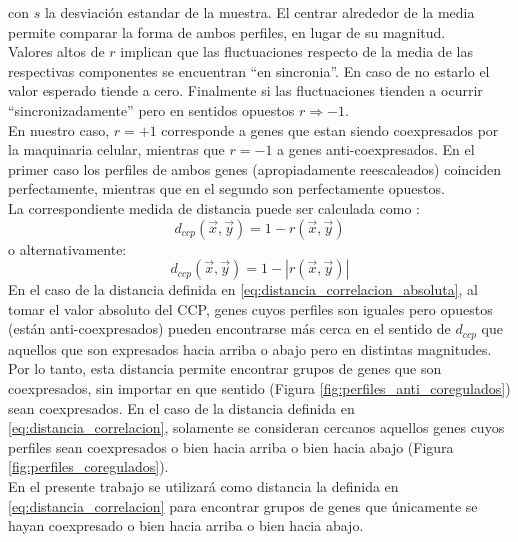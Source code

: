con $s$ la desviación estandar de la muestra. El centrar alrededor de la media permite comparar la forma de ambos perfiles, en lugar de su magnitud.\\
Valores altos de $r$ implican que las fluctuaciones respecto de la media de las respectivas componentes se encuentran ``en sincronia''. En caso de no estarlo el valor esperado tiende a cero. Finalmente si las fluctuaciones tienden a ocurrir ``sincronizadamente'' pero en sentidos opuestos $r \Rightarrow -1$.\\
En nuestro caso, $r=+1$ corresponde a genes que estan siendo coexpresados por la maquinaria celular, mientras que $r=-1$ a genes anti-coexpresados. En el primer caso los perfiles de ambos genes
(apropiadamente reescaleados) coinciden perfectamente, mientras que en el segundo son perfectamente opuestos.\\
La correspondiente medida de distancia puede ser calculada como \cite{Dhaeseleer2005}:
\begin{equation}
	d_{ccp}(\vec{x}, \vec{y}) = 1-r(\vec{x}, \vec{y})
	\label{eq:distancia_correlacion}
\end{equation}
o alternativamente:
\begin{equation}
	d_{ccp}(\vec{x}, \vec{y}) = 1-|r(\vec{x}, \vec{y})|
	\label{eq:distancia_correlacion_absoluta}
\end{equation}
En el caso de la distancia definida en \ref{eq:distancia_correlacion_absoluta}, al tomar el valor absoluto del CCP, genes cuyos perfiles son iguales pero opuestos (están anti-coexpresados) pueden encontrarse más cerca en el sentido de $d_{ccp}$ que aquellos que son expresados hacia arriba o abajo pero en distintas magnitudes. Por lo tanto, esta distancia permite encontrar grupos de genes que son coexpresados, sin importar en que sentido (Figura \ref{fig:perfiles_anti_coregulados}) sean coexpresados.
En el caso de la distancia definida en \ref{eq:distancia_correlacion}, solamente se consideran cercanos aquellos genes cuyos perfiles sean coexpresados o bien hacia arriba o bien hacia abajo (Figura \ref{fig:perfiles_coregulados}).\cite{Hennig2013, Kheng2010, Babu2004, Gan2007}\\
En el presente trabajo se utilizará como distancia la definida en \ref{eq:distancia_correlacion} para encontrar grupos de genes que únicamente se hayan coexpresado o bien hacia arriba o bien hacia abajo.\cite{Eisen1998}
\clearpage
